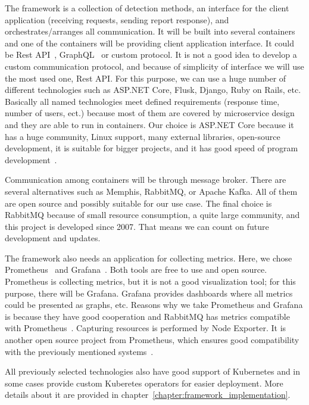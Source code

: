 The framework is a collection of detection methods, an interface for the client application (receiving requests, sending report response), and orchestrates/arranges all communication. It will be built into several containers and one of the containers will be providing client application interface. It could be Rest API~\cite{RestAPI}, GraphQL~\cite{GraphQL} or custom protocol. It is not a good idea to develop a custom communication protocol, and because of simplicity of interface we will use the most used one, Rest API. For this purpose, we can use a huge number of different technologies such as ASP.NET Core, Flusk, Django, Ruby on Rails, etc. Basically all named technologies meet defined requirements (response time, number of users, ect.) because most of them are covered by microservice design and they are able to run in containers. Our choice is ASP.NET Core because it has a huge community, Linux support, many external libraries, open-source development, it is suitable for bigger projects, and it has good speed of program development~\cite{ASPNETCore}.

Communication among containers will be through message broker. There are several alternatives such as Memphis, RabbitMQ, or Apache Kafka. All of them are open source and possibly suitable for our use case. The final choice is RabbitMQ because of small resource consumption, a quite large community, and this project is developed since 2007. That means we can count on future development and updates.~\cite{MessageBrokers}

The framework also needs an application for collecting metrics. Here, we chose Prome\-theus~\cite{Prometheus} and Grafana~\cite{Grafana}. Both tools are free to use and open source. Prometheus is collecting metrics, but it is not a good visualization tool; for this purpose, there will be Grafana. Grafana provides dashboards where all metrics could be presented as graphs, etc. Reasons why we take Prometheus and Grafana is because they have good cooperation and RabbitMQ has metrics compatible with Prometheus~\cite{RabbitMQMonitoring}. Capturing resources is performed by Node Exporter. It is another open source project from Prometheus, which ensures good compatibility with the previously mentioned systems~\cite{NodeExporter}.

All previously selected technologies also have good support of Kubernetes and in some cases provide custom Kuberetes operators for easier deployment. More details about it are provided in chapter~\ref{chapter:framework_implementation}.

